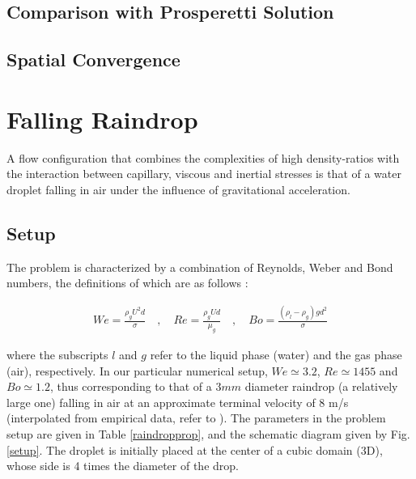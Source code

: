 \subsection*{Comparison with Prosperetti Solution}
\blindtext

\subsection*{Spatial Convergence}
\blindtext


\section{Falling Raindrop}

A flow configuration that combines the complexities of high density-ratios with the interaction between capillary, viscous and inertial stresses is that of a water droplet falling in air under the influence of gravitational acceleration. 


\subsection*{Setup}
The problem is characterized by a combination of Reynolds, Weber and Bond numbers, the definitions of which are as follows : 

\begin{align}
We=\frac{\rho_{g} U^2 d}{\sigma} \quad,\quad Re= \frac{\rho_{g} U d}{\mu_{g}} \quad,\quad Bo=\frac{\left(\rho_{l}-\rho_{g}\right) g d^2 }{\sigma}
\end{align}

where the subscripts $l$ and $g$ refer to the liquid phase (water) and the gas phase (air), respectively. In our particular numerical setup, $We \simeq 3.2 $, $Re \simeq 1455 $ and $Bo \simeq 1.2 $, thus corresponding to that of a $3mm$ diameter raindrop (a relatively large one) falling in air at an approximate terminal velocity of  $8$ m/s (interpolated from empirical data, refer to  \cite{gunn1949terminal}). The parameters in the problem setup are given in Table \ref{raindropprop}, and the schematic diagram given by Fig. \ref{setup}. The droplet is initially placed at the center of a cubic domain (3D), whose side is 4 times the diameter of the drop. 

